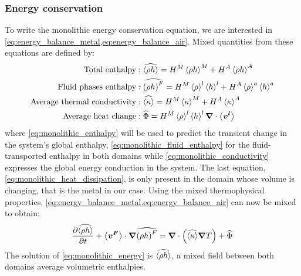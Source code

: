 \subsubsection{Energy conservation}
To write the monolithic energy conservation equation, we are interested in \cref{eq:energy_balance_metal,eq:energy_balance_air}.
Mixed quantities from these equations are defined by:
\begin{align}
%
\label{eq:monolithic_enthalpy}
\text{Total enthalpy}&: \mix{\avg{\rho h}} =  \heavisideM \avg{\rho h}^M + \heavisideA \avg{\rho h}^A  \\
%
\label{eq:monolithic_fluid_enthalpy}
\text{Fluid phases enthalpy}&: \mix{\brac{\rho h}^F} = \heavisideM \rhol \hl + \heavisideA \rhoa \ha \\
%
\label{eq:monolithic_conductivity}
\text{Average thermal conductivity}&: \mix{\avg{\kappa}} = \heavisideM \avg{\kappa}^M + \heavisideA \avg{\kappa}^A \\
%
\label{eq:monolithic_heat_dissipation}
\text{Average heat change}&: \mix{\Phi} = \heavisideM \rhol \hl \nabvec \cdot \vit
\end{align}
where \cref{eq:monolithic_enthalpy} will be used to predict the transient change in the system's global enthalpy, 
\cref{eq:monolithic_fluid_enthalpy} for the fluid-transported enthalpy in both domains while \cref{eq:monolithic_conductivity}
expresses the global energy conduction in the system. The last equation, \cref{eq:monolithic_heat_dissipation}, is only present in the 
domain whose volume is changing, that is the metal in our case.
Using the mixed thermophysical properties, \cref{eq:energy_balance_metal,eq:energy_balance_air} can now be mixed to obtain:
\begin{align}
\label{eq:monolithic_energy}
\frac{\partial \widehat{\left \langle \rho h \right \rangle}}{\partial t} 
		+ \left \langle \boldsymbol{v^F} \right \rangle \cdot \boldsymbol{\nabla} \widehat{\left( \rho h \right)^F}
		= \boldsymbol{\nabla}  \cdot \left( \widehat{\left \langle \kappa \right \rangle} \boldsymbol{\nabla} T  \right)
		+ \widehat{\Phi} 
\end{align}
The solution of \cref{eq:monolithic_energy} is $\widehat{\left \langle \rho h \right \rangle}$, a mixed field between both domains average volumetric
enthalpies.

 
